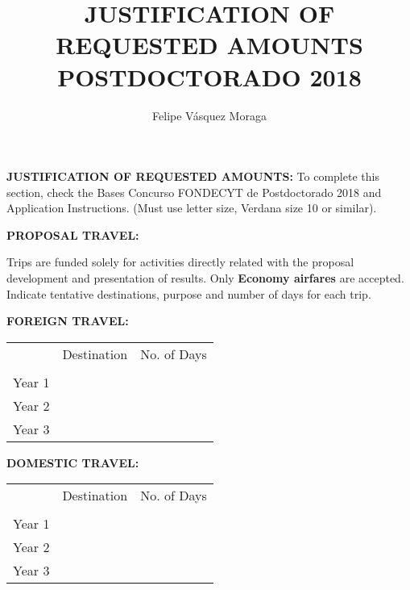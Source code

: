 ﻿\documentclass[10pt]{article}
\author{Felipe Vásquez Moraga}
\title{JUSTIFICATION OF REQUESTED AMOUNTS POSTDOCTORADO 2018}
\begin{document}
\noindent \textbf{JUSTIFICATION OF REQUESTED AMOUNTS:}
\vspace{5pt}
\noindent To complete this section, check the Bases Concurso FONDECYT de Postdoctorado 2018 and Application Instructions. 
\vspace{5pt}
\noindent(Must use letter size, Verdana size 10 or similar).



\noindent \textbf{PROPOSAL TRAVEL:  }

\noindent Trips are funded solely for activities directly related with the proposal development and presentation of results. Only \textbf{Economy airfares} are accepted. Indicate tentative destinations, purpose and number of days for each trip.

\vspace{15pt}
\noindent\textbf{FOREIGN TRAVEL:}
\vspace{15pt}

\begin{tabular}{l|l|l|}
\cline{2-3}
                             & Destination & No. of Days \\ \cline{2-3} 
                             &             &             \\ \hline
\multicolumn{1}{|l|}{Year 1} &             &             \\ \hline
\multicolumn{1}{|l|}{Year 2} &             &             \\ \hline
\multicolumn{1}{|l|}{Year 3} &             &             \\ \hline
\end{tabular}
\vspace{15pt}

\textbf{\uppercase{DOMESTIC TRAVEL: }}
\vspace{15pt}

\begin{tabular}{l|l|l|}
\cline{2-3}
                             & Destination & No. of Days \\ \cline{2-3} 
                             &             &             \\ \hline
\multicolumn{1}{|l|}{Year 1} &             &             \\ \hline
\multicolumn{1}{|l|}{Year 2} &             &             \\ \hline
\multicolumn{1}{|l|}{Year 3} &             &             \\ \hline
\end{tabular}
\vspace{15pt}
\end{document}
